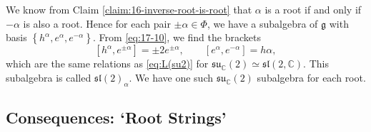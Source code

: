 We know from Claim \ref{claim:16-inverse-root-is-root} that $\alpha$ is a root if and only if $-\alpha$ is also a root. Hence for each pair $\pm \alpha \in \Phi$, we have a subalgebra of $\mathfrak{g}$ with basis $\left\{ h^{\alpha}, e^{\alpha}, e^{-\alpha} \right\}$. From \eqref{eq:17-10}, we find the brackets
\begin{equation}
  \label{eq:17-11}
  [h^{\alpha}, e^{\pm \alpha}] = \pm 2 e^{\pm \alpha}, \qquad 
  [e^{\alpha}, e^{-\alpha}] = h\alpha,
\end{equation}
which are the same relations as \eqref{eq:L(su2)} for $\mathfrak{su}_{\mathbb{C}}(2) \simeq \mathfrak{sl}(2, \mathbb{C})$.
This subalgebra is called $\mathfrak{sl}(2)_{\alpha}$. We have one such $\mathfrak{su}_{\mathbb{C}}(2)$ subalgebra for each root.

\subsection{Consequences: `Root Strings'}%


